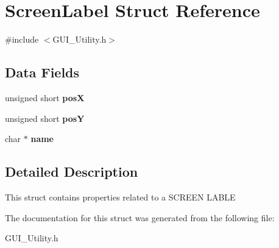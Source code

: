 \hypertarget{struct_screen_label}{}\section{Screen\+Label Struct Reference}
\label{struct_screen_label}


{\ttfamily \#include $<$G\+U\+I\+\_\+\+Utility.\+h$>$}

\subsection*{Data Fields}
\begin{DoxyCompactItemize}
\item 
\mbox{\label{struct_screen_label_af238852daf73a1aea2311d8b0754cb04}} 
unsigned short {\bfseries posX}
\item 
\mbox{\label{struct_screen_label_ab7a76f4802c250b82ea76bebdd5c6b72}} 
unsigned short {\bfseries posY}
\item 
\mbox{\label{struct_screen_label_a89c5a32bbacb5610cebd283c96235126}} 
char $\ast$ {\bfseries name}
\end{DoxyCompactItemize}


\subsection{Detailed Description}
This struct contains properties related to a S\+C\+R\+E\+EN L\+A\+B\+LE 

The documentation for this struct was generated from the following file\+:\begin{DoxyCompactItemize}
\item 
G\+U\+I\+\_\+\+Utility.\+h\end{DoxyCompactItemize}
